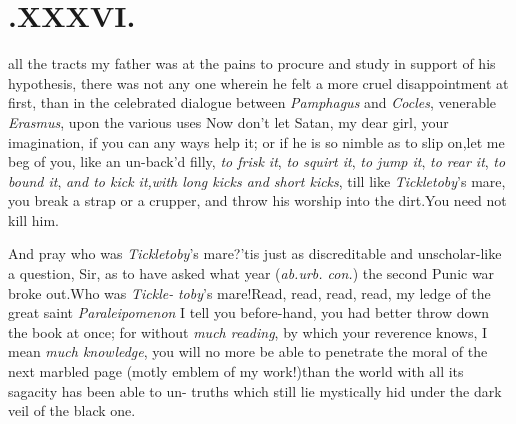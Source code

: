 \documentclass{article}
\begin{document}
\section{.\quad  XXXVI.}

 all the tracts my father was at
the pains to procure and study in support of his hypothesis, there
was not any one wherein he felt a more cruel disappointment at
first, than in the celebrated dialogue between \textit{Pamphagus} and
\textit{Cocles}, 
venerable \textit{Erasmus}, upon the various uses
\tsh Now don’t let Satan, my dear girl, 
your imagination, if you can any ways help it; or if he is so
nimble as to slip on,\tsh let me beg of you, like an un-\break back’d
filly, \textit{to frisk it}, 
\textit{to squirt it}, 
\textit{to jump it}, 
\textit{to rear it}, 
\textit{to bound it},\tsh 
\textit{and to kick it,\break with long kicks and short
kicks}, till like \textit{Tickletoby}’s mare, you break a
strap\break
or a crupper, and throw his worship\break
into the dirt.\tsh You need not kill\break
him.\tsh

\tsk And pray who was \textit{Tickletoby}’s
mare?\tsk ’tis just as discreditable and un\-scholar-like a
question, Sir, as to have asked what year (\textit{ab.\@ urb.\@
con.})\@
the second Punic war broke out.\tsk Who was
\textit{Tickle-}
\textit{toby}’s mare!\tsk Read, read, read, read, my\break
{}
ledge of the great saint \textit{Paraleipomenon}\tsk\break
I tell you before-hand, you had better
throw down the book at once; for without
\textit{much reading}, by which
your reverence knows, I mean \textit{much knowledge}, you\break
will no more be able to penetrate the moral of the next marbled page 
(motly emblem
of my work!)\@ than the world with all its sagacity has been able to
un-\break
{}\break
truths which still lie
mystically hid under the dark veil of the black
one.
\end{document}

